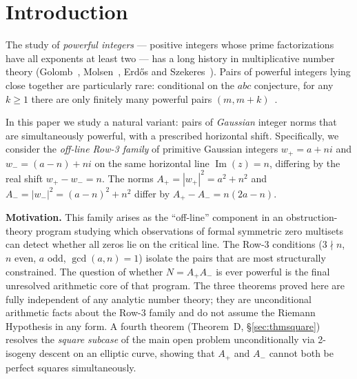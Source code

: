 \documentclass[12pt]{amsart}
\theoremstyle{plain}
\theoremstyle{definition}
\theoremstyle{remark}
\newcommand{\Aplus}{A_{+}}
\newcommand{\Aminus}{A_{-}}
\begin{document}
\maketitle
\tableofcontents

\section{Introduction}
\label{sec:intro}%

The study of \emph{powerful integers} --- positive integers whose prime
factorizations have all exponents at least two --- has a long history in
multiplicative number theory
(Golomb~\cite{Golomb1970}, Molsen~\cite{Molsen1939},
Erd\H{o}s and Szekeres~\cite{ErdosSzekeres1935}).
Pairs of powerful integers lying close together are particularly rare:
conditional on the $abc$ conjecture, for any $k\geq 1$ there are only
finitely many powerful pairs $(m, m+k)$~\cite{Granville1998}.

In this paper we study a natural variant: pairs of \emph{Gaussian} integer
norms that are simultaneously powerful, with a prescribed horizontal shift.
Specifically, we consider the \emph{off-line Row-3 family} of primitive
Gaussian integers $w_{+}=a+ni$ and $w_{-}=(a-n)+ni$ on the same
horizontal line $\operatorname{Im}(z)=n$, differing by the real shift
$w_{+}-w_{-}=n$.  The norms $\Aplus = |w_{+}|^2 = a^2+n^2$ and
$\Aminus = |w_{-}|^2 = (a-n)^2+n^2$ differ by
$\Aplus - \Aminus = n(2a-n)$.

\medskip
\noindent\textbf{Motivation.}  This family arises as the ``off-line''
component in an obstruction-theory program studying which
observations of formal symmetric zero multisets can detect whether
all zeros lie on the critical line.  The Row-3 conditions ($3\nmid n$,
$n$ even, $a$ odd, $\gcd(a,n)=1$) isolate the pairs that are
most structurally constrained.  The question of whether $N = \Aplus\Aminus$
is ever powerful is the final unresolved arithmetic core of that program.
The three theorems proved here are fully independent of any analytic
number theory; they are unconditional arithmetic facts about the Row-3
family and do not assume the Riemann Hypothesis in any form.
A fourth theorem (Theorem~D, \S\ref{sec:thmsquare}) resolves the \emph{square
subcase} of the main open problem unconditionally via 2-isogeny descent on an
elliptic curve, showing that $\Aplus$ and $\Aminus$ cannot both be perfect
squares simultaneously.
\end{document}

